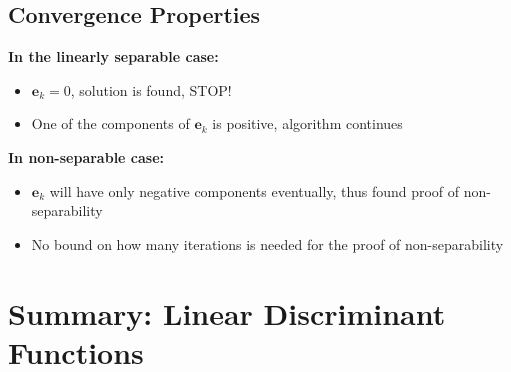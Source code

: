 \documentclass[11pt,a4paper]{article}
\theoremstyle{definition}
\theoremstyle{plain}
\theoremstyle{remark}
\begin{document}
\subsection{Convergence Properties}

\begin{tcolorbox}[colback=green!5!white,colframe=green!75!black,title=\textbf{Ho-Kashyap Convergence}]
\textbf{In the linearly separable case:}
\begin{itemize}
    \item $\mathbf{e}_k = 0$, solution is found, STOP!
    \item One of the components of $\mathbf{e}_k$ is positive, algorithm continues
\end{itemize}

\textbf{In non-separable case:}
\begin{itemize}
    \item $\mathbf{e}_k$ will have only negative components eventually, thus found proof of non-separability
    \item No bound on how many iterations is needed for the proof of non-separability
\end{itemize}
\end{tcolorbox}

\section{Summary: Linear Discriminant Functions}
\end{document}
